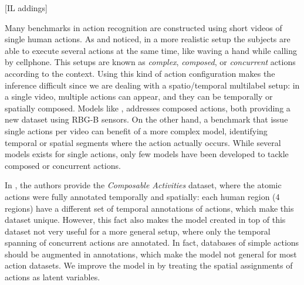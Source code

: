 [IL addings]
 
Many benchmarks in action recognition are constructed using short videos of single human actions. As \cite{Lillo2014} and \cite{Wei2013} noticed, in a more realistic setup the  subjects are able to execute several actions at the same time, like waving a hand while calling by cellphone. This setups are known as \emph{complex}, \emph{composed}, or \emph{concurrent} actions according to the context. Using this kind of action configuration makes the inference difficult since we are dealing with a spatio/temporal multilabel setup: in a single video, multiple actions can appear, and they can be temporally or spatially composed. Models like \cite{Lillo2014}, \cite{Wei2013} addresses composed actions, both providing a new dataset using RBG-B sensors. On the other hand, a benchmark that issue single actions per video can benefit of a more complex model, identifying  temporal or spatial segments where the action actually occurs. While several models exists for single actions, only few models have been developed to tackle composed or concurrent actions.

In \cite{Lillo2014}, the authors provide the \emph{Composable Activities} dataset, where the atomic actions were fully annotated temporally and spatially: each human region (4 regions) have a different set of temporal annotations of actions, which make this dataset unique. However, this fact also makes the model created in top of this dataset not very useful for a more general setup, where only the temporal spanning of concurrent actions are annotated. In fact, databases of simple actions should be augmented in annotations,  which make the model not general for most action datasets. We improve the model in \cite{Lillo2014} by treating the spatial assignments of actions as latent variables. 
